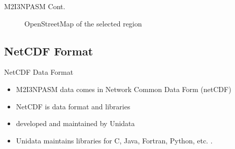 \documentclass[../00_main.tex]{subfiles}
\begin{document}
\begin{frame}{M2I3NPASM Cont.}
    \begin{figure}[H]
        \center
        \caption{OpenStreetMap of the selected region}
        \label{map}
    \end{figure}
\end{frame}

\subsection{NetCDF Format}

\begin{frame}{NetCDF Data Format}
    \begin{itemize}
        \item M2I3NPASM data comes in Network Common Data Form (netCDF)
        \item NetCDF is data format and libraries \cite{netcdf}
        \item developed and maintained by Unidata \cite{unidata}
        \item Unidata maintains libraries for C, Java, Fortran, Python, etc. \cite{netcdf-facts}.
    \end{itemize}
\end{frame}
\end{document}
